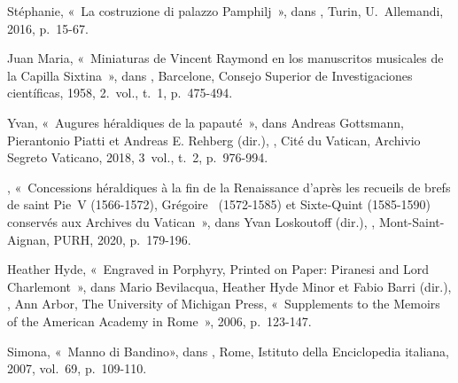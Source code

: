 \begin{teiElement}[name={TEI},change={commons\_edition}]
\begin{teiElement}[name={text},type={book},xmlid={book}]
\begin{teiElement}[name={group},type={book},xmlid={book-001}]
\begin{teiElement}[name={group},type={bibliography},data-page-title={Sources et bibliographie},data-include-href={Ch14\_Source\_bibliographie.xml},xmlid={bibliography-001}]
\begin{teiElement}[name={body}]
\begin{teiDiv}[type={section1},xmlid={div18}]
\begin{teiDiv}[type={section2},xmlid={div19}]
\begin{teiBibl}[xmlid={bibl-390}]
\end{teiBibl}
              \begin{teiBibl}[xmlid={bibl-391}]
 Stéphanie, « La costruzione di palazzo Pamphilj », dans , Turin, U. Allemandi, 2016, p. 15-67. 
\end{teiBibl}
              \begin{teiBibl}[xmlid={bibl-392}]
 Juan Maria, « Miniaturas de Vincent Raymond en los manuscritos musicales de la Capilla Sixtina », dans , Barcelone, Consejo Superior de Investigaciones científicas, 1958, 2. vol., t. 1, p. 475-494.
\end{teiBibl}
              \begin{teiBibl}[xmlid={bibl-393}]
 Yvan, « Augures héraldiques de la papauté », dans Andreas Gottsmann, Pierantonio Piatti et Andreas E. Rehberg (dir.), , Cité du Vatican, Archivio Segreto Vaticano, 2018, 3 vol., t. 2, p. 976-994.
\end{teiBibl}
              \begin{teiBibl}[xmlid={bibl-394}]
, « Concessions héraldiques à la fin de la Renaissance d’après les recueils de brefs de saint Pie V (1566-1572), Grégoire  (1572-1585) et Sixte-Quint (1585-1590) conservés aux Archives du Vatican », dans Yvan Loskoutoff (dir.), , Mont-Saint-Aignan, PURH, 2020, p. 179-196.
\end{teiBibl}
              \begin{teiBibl}[xmlid={bibl-395}]
 Heather Hyde, « Engraved in Porphyry, Printed on Paper: Piranesi and Lord Charlemont », dans Mario Bevilacqua, Heather Hyde Minor et Fabio Barri (dir.), , Ann Arbor, The University of Michigan Press, « Supplements to the Memoirs of the American Academy in Rome », 2006, p. 123-147.
\end{teiBibl}
              \begin{teiBibl}[xmlid={bibl-396}]
 Simona, « Manno di Bandino», dans , Rome, Istituto della Enciclopedia italiana, 2007, vol. 69, p. 109-110.

\end{teiBibl}
\end{teiDiv}
\end{teiDiv}
\end{teiElement}
\end{teiElement}
\end{teiElement}
\end{teiElement}
\end{teiElement}
